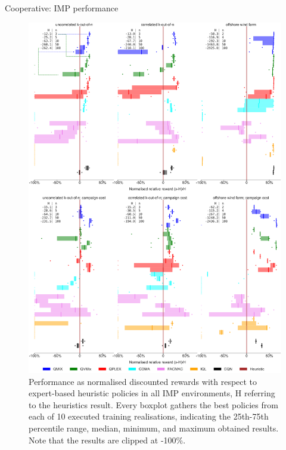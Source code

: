 \documentclass[9pt, hyperref={pdfusetitle,colorlinks=true,allcolors=DarkBlue}]{beamer}
\begin{document}
\begin{frame}{Cooperative: IMP performance}
\captionsetup{font=scriptsize}
    \begin{figure}
    \centering
    \includegraphics[width=.9\textwidth]{boxplot_perc_limit_down.pdf}
\caption{Performance as normalised discounted rewards with respect to expert-based heuristic policies in all IMP environments, H referring to the heuristics result.
Every boxplot gathers the best policies from each of 10 executed training realisations, indicating the 25th-75th percentile range, median, minimum, and maximum obtained results.
Note that the results are clipped at -100\%.
}
\label{fig:imp_results2}
\end{figure}
\end{frame}
\end{document}
